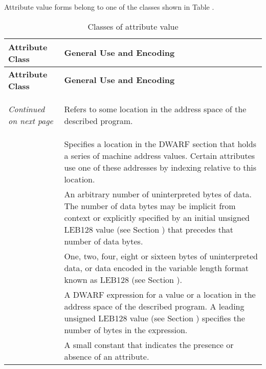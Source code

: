 Attribute value forms belong
to one of the classes shown in Table .

\begin{longtable}{l|P{11cm}}
\caption{Classes of attribute value}
\label{tab:classesofattributevalue} \\
\hline \bfseries Attribute Class & \bfseries General Use and Encoding \\ \hline
\endfirsthead
  \bfseries Attribute Class & \bfseries General Use and Encoding \\ \hline
\endhead
  \hline \emph{Continued on next page}
\endfoot
  \hline
\endlastfoot

\hypertarget{chap:classaddress}{}
&Refers to some location in the address space of the \mbox{described} program.
\\

\hypertarget{chap:classaddrptr}{}
&
Specifies a location in the DWARF section that holds
a series of machine address values. Certain attributes use
one of these addresses by indexing relative to this location.
\\

\hypertarget{chap:classblock}{}
& An arbitrary number of uninterpreted bytes of data.
The number of data bytes may be implicit from context
or explicitly specified by an initial unsigned LEB128 value
(see Section ) 
that precedes that number of data bytes.
\\
 
\hypertarget{chap:classconstant}{}
&One, two, four, eight or sixteen 
bytes of uninterpreted data, or data
encoded in the variable length format known as LEB128 
(see Section ).
\\

\hypertarget{chap:classexprloc}{}
&A DWARF expression for a value or a location in the 
address space of the described program.
A leading unsigned LEB128 value 
(see Section )
specifies the number of bytes in the expression.
\\

\hypertarget{chap:classflag}{}
&A small constant that indicates the presence or absence 
of an attribute.
\\


\end{longtable}

